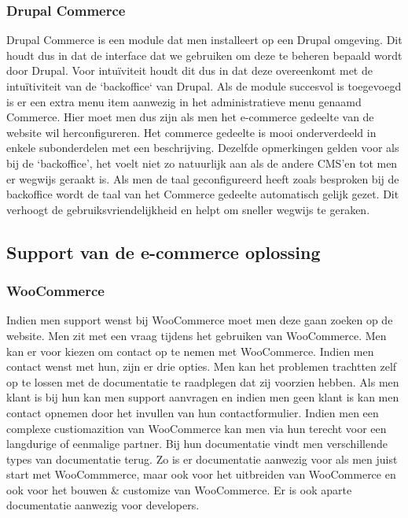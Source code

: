 \subsubsection{Drupal Commerce}
Drupal Commerce is een module dat men installeert op een Drupal omgeving. Dit houdt dus in dat de interface dat we gebruiken om deze te beheren bepaald wordt door Drupal. Voor intuïviteit houdt dit dus in dat deze overeenkomt met de intuïtiviteit van de `backoffice` van Drupal. Als de module succesvol is toegevoegd is er een extra menu item aanwezig in het administratieve menu genaamd Commerce. Hier moet men dus zijn als men het e-commerce gedeelte van de website wil herconfigureren. Het commerce gedeelte is mooi onderverdeeld in enkele subonderdelen met een beschrijving. Dezelfde opmerkingen gelden voor als bij de `backoffice', het voelt niet zo natuurlijk aan als de andere CMS'en tot men er wegwijs geraakt is. Als men de taal geconfigureerd heeft zoals besproken bij de backoffice wordt de taal van het Commerce gedeelte automatisch gelijk gezet. Dit verhoogt de gebruiksvriendelijkheid en helpt om sneller wegwijs te geraken.
\subsection{Support van de e-commerce oplossing}
\subsubsection{WooCommerce}
Indien men support wenst bij WooCommerce moet men deze gaan zoeken op de website. Men zit met een vraag tijdens het gebruiken van WooCommerce. Men kan er voor kiezen om contact op te nemen met WooCommerce. Indien men contact wenst met hun, zijn er drie opties. Men kan het problemen trachtten zelf op te lossen met de documentatie te raadplegen dat zij voorzien hebben. Als men klant is bij hun kan men support aanvragen en indien men geen klant is kan men contact opnemen door het invullen van hun contactformulier. Indien men een complexe custiomazition van WooCommerce kan men via hun terecht voor een langdurige of eenmalige partner. Bij hun documentatie vindt men verschillende types van documentatie terug. Zo is er documentatie aanwezig voor als men juist start met WooCommmerce, maar ook voor het uitbreiden van WooCommerce en ook voor het bouwen \& customize van WooCommerce. Er is ook aparte documentatie aanwezig voor developers.
